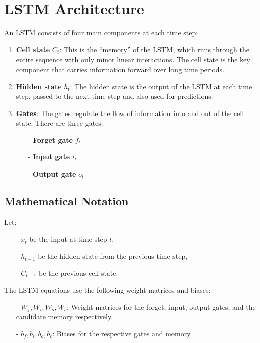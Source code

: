\documentclass[10pt]{article}
\begin{document}
\section{ LSTM Architecture}

An LSTM consists of four main components at each time step:

\begin{enumerate}
   \item {\bf Cell state} \(C_t\): This is the “memory” of the LSTM, which runs through the entire sequence with only minor linear interactions. The cell state is the key component that carries information forward over long time periods.
   \item {\bf Hidden state} \(h_t\): The hidden state is the output of the LSTM at each time step, passed to the next time step and also used for predictions.
   \item {\bf Gates}: The gates regulate the flow of information into and out of the cell state. There are three gates:
      \begin{itemize}
         \item [-] {\bf Forget gate} \(f_t\)
         \item [-] {\bf Input gate} \(i_t\)
         \item [-] {\bf Output gate} \(o_t\)
      \end{itemize}
\end{enumerate}

\subsection{Mathematical Notation}
Let:

\begin{itemize}
   \item [-] \( x_t \) be the input at time step \( t \),
   \item [-] \( h_{t-1} \) be the hidden state from the previous time step,
   \item [-] \( C_{t-1} \) be the previous cell state.
\end{itemize}

The LSTM equations use the following weight matrices and biases:

\begin{itemize}
   \item [-] \( W_f, W_i, W_o, W_c \): Weight matrices for the forget, input, output gates, and the candidate memory respectively.
   \item [-] \( b_f, b_i, b_o, b_c \): Biases for the respective gates and memory.
\end{itemize}
\end{document}
